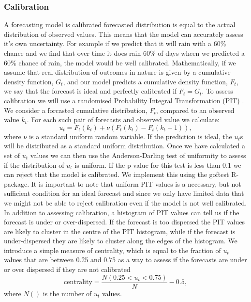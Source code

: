 \documentclass[12pt]{article}
\begin{document}
\subsubsection{Calibration}
A forecasting model is calibrated forecasted distribution is equal to the actual distribution of observed values. This means that the model can accurately assess it's own uncertainty. For example if we predict that it will rain with a 60\% chance and we find that over time it does rain 60\% of days wheen we predicted a 60\% chance of rain, the model would be well calibrated. Mathematically, if we assume that real distribution of outcomes in nature is given by a cumulative density function, $G_t$, and our model predicts a cumulative density function, $F_t$, we say that the forecast is ideal and perfectly calibrated if $F_t=G_t$. To assess calibration we will use a randomised Probability Integral Transformation (PIT) \cite{czadoPredictiveModelAssessment2009a}. We consider a forcasted cumulative distribution, $F_t$, compared to an observed value $k_t$. For each such pair of forecasts and observed value we calculate:
\[ u_t = F_t(k_t) + \nu (F_t(k_t) - F_t(k_t -1)),\]
where $\nu$ is a standard uniform random variable. If the prediction is ideal, the $u_t$s will be distributed as a standard uniform distribution. Once we have calculated a set of $u_t$ values we can then use the Anderson-Darling test of uniformity to assess if the distribution of $u_t$ is uniform. If the p-value for this test is less than 0.1 we can reject that the model is calibrated. We implement this using the goftest \cite{farawayGoftestClassicalGoodnessofFit2017} R-package. It is important to note that uniform PIT values is a necessary, but not sufficient condition for an ideal forecast and since we only have limited data that we might not be able to reject calibration even if the model is not well calibrated. In addition to assessing calibration, a histogram of PIT values can tell us if the forecast is under or over-dispersed\cite{czadoPredictiveModelAssessment2009a}. If the forecast is too dispersed the PIT values are likely to cluster in the centre of the PIT histogram, while if the forecast is under-dispersed they are likely to cluster along the edges of the histogram. We introduce a simple measure of centrality, which is equal to the fraction of $u_t$ values that are between 0.25 and 0.75 as a way to assess if the forecasts are under or over dispersed if they are not calibrated
\[\text{centrality} = \frac{N(0.25 < u_t < 0.75)}{N} - 0.5,\]
where $N()$ is the number of $u_t$ values.
\end{document}
